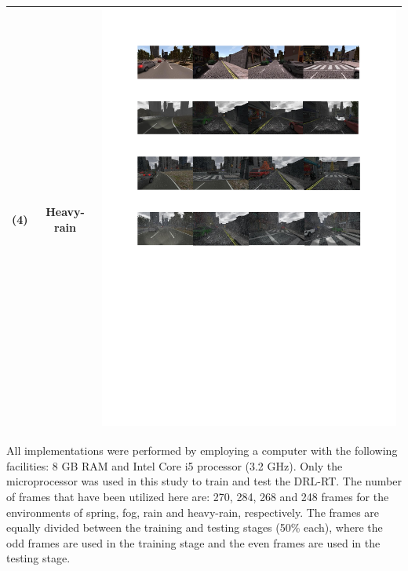 \documentclass{svproc}
\begin{document}
\begin{table}[!t]
\begin{tabular}{|C{1.5cm}|c|C{8.5cm}|}
		(4)	& Heavy- rain & \begin{minipage}{.9\textwidth}\includegraphics[scale=.5,trim=2cm 12.5cm 2cm 14.3cm,clip]{examples.pdf}\end{minipage} \\ \hline
	\end{tabular}
\end{table}

All implementations were performed by employing a computer with the following facilities: 8 GB RAM and Intel Core i5 processor (3.2 GHz). Only the microprocessor was used in this study to train and test the DRL-RT. The number of frames that have been utilized here are: 270, 284, 268 and 248 frames for the environments of spring, fog, rain and heavy-rain, respectively. The frames are equally divided between the training and testing stages (50\% each), where the odd frames are used in the training stage and the even frames are used in the testing stage.
\end{document}
